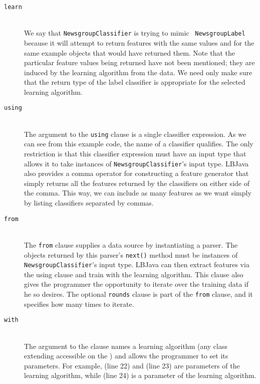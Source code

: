 \begin{description}

\item[{\tt learn}]\hfill\\
%
{\justify We say that {\tt NewsgroupClassifier} is trying to mimic {\tt
NewsgroupLabel} because it will attempt to return features with the same
values and for the same example objects that  would have
returned them.  Note that the particular feature values being returned have
not been mentioned; they are induced by the learning algorithm from the data.
We need only make sure that the return type of the label classifier is
appropriate for the selected learning algorithm.}

\item[{\tt using}]\hfill\\
%
The argument to the {\tt using} clause is a single classifier expression.  As
we can see from this example code, the name of a classifier qualifies.  The
only restriction is that this classifier expression must have an input type
that allows it to take instances of {\tt NewsgroupClassifier}'s input type.
LBJava also provides a comma operator for constructing a feature generator that
simply returns all the features returned by the classifiers on either side of
the comma.  This way, we can include as many features as we want simply by
listing classifiers separated by commas.
%

\item[{\tt from}]\hfill\\
%
The {\tt from} clause supplies a data source by instantiating a parser.  The
objects returned by this parser's {\tt next()} method must be instances of
{\tt NewsgroupClassifier}'s input type.  LBJava can then extract features via the
using clause and train with the learning algorithm.  This clause also gives
the programmer the opportunity to iterate over the training data if he so
desires.  The optional {\tt rounds} clause is part of the {\tt from} clause,
and it specifies how many times to iterate.

\item[{\tt with}]\hfill\\
%
The argument to the  clause names a learning algorithm (any class
extending  accessible on the ) and
allows the programmer to set its parameters.  For example, 
(line 22) and  (line 23) are parameters of the
 learning algorithm, while  (line
24) is a parameter of the  learning algorithm.

\end{description}

